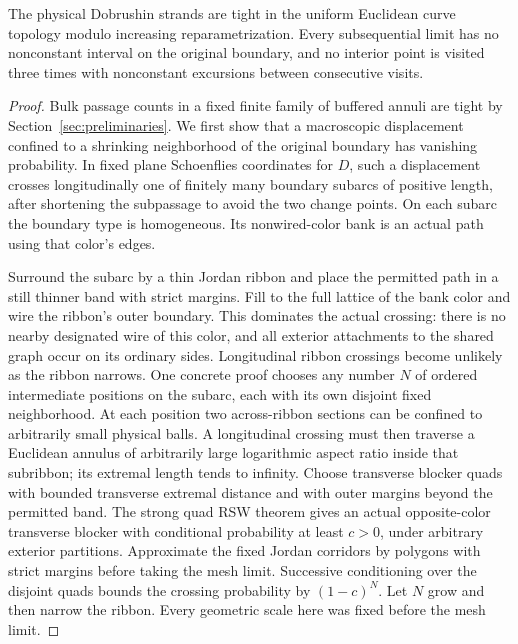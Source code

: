 \begin{lemma}\label{chordal:compactness}
The physical Dobrushin strands are tight in the uniform Euclidean
curve topology modulo increasing reparametrization.  Every
subsequential limit has no nonconstant interval on the original
boundary, and no interior point is visited three times with
nonconstant excursions between consecutive visits.
\end{lemma}
\begin{proof}
Bulk passage counts in a fixed finite family of buffered annuli are
tight by Section~\ref{sec:preliminaries}.  We first show that a
macroscopic displacement confined to a shrinking neighborhood of the
original boundary has vanishing probability.  In fixed plane
Schoenflies coordinates for $D$, such a displacement crosses
longitudinally one of finitely many boundary subarcs of positive
length, after shortening the subpassage to avoid the two change
points.  On each subarc the boundary type is homogeneous.  Its
nonwired-color bank is an actual path using that color's edges.

Surround the subarc by a thin Jordan ribbon and place the permitted
path in a still thinner band with strict margins.  Fill to the full
lattice of the bank color and wire the ribbon's outer boundary.
This dominates the actual crossing: there is no nearby designated
wire of this color, and all exterior attachments to the shared graph
occur on its ordinary sides.  Longitudinal ribbon crossings become
unlikely as the ribbon narrows.  One concrete proof chooses any
number $N$ of ordered intermediate positions on the subarc, each
with its own disjoint fixed neighborhood.  At each position two
across-ribbon sections can be confined to arbitrarily small physical
balls.  A longitudinal crossing must then traverse a Euclidean
annulus of arbitrarily large logarithmic aspect ratio inside that
subribbon; its extremal length tends to infinity.  Choose transverse
blocker quads with bounded transverse extremal distance and with outer
margins beyond the permitted band.  The strong quad RSW theorem
\cite[Theorem~1.2]{DMT2021Fractal} gives an actual opposite-color
transverse blocker with conditional probability at least $c>0$,
under arbitrary exterior partitions.  Approximate the fixed Jordan
corridors by polygons with strict margins before taking the mesh
limit.  Successive conditioning over the disjoint quads bounds the
crossing probability by $(1-c)^N$.  Let $N$ grow and then narrow the
ribbon.  Every geometric scale here was fixed before the mesh limit.


\end{proof}
